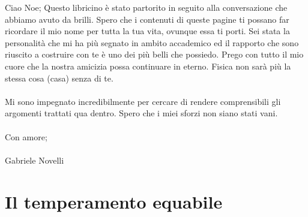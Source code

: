 \documentclass[12pt,a4paper]{book}
\theoremstyle{definition}
\theoremstyle{Theorem}
\theoremstyle{definition}
\theoremstyle{definition}
\theoremstyle{definition}
\begin{document}
	\setpdftargetpages
	Ciao Noe;
	Questo libricino è stato partorito in seguito alla conversazione che abbiamo avuto da brilli. Spero che i contenuti di queste pagine ti possano far ricordare il mio nome per tutta la tua vita, ovunque essa ti porti. Sei stata la personalità che mi ha più segnato in ambito accademico ed il rapporto che sono riuscito a costruire con te è uno dei più belli che possiedo. Prego con tutto il mio cuore che la nostra amicizia possa continuare in eterno. Fisica non sarà più la stessa cosa (casa) senza di te. \\
	\\
	Mi sono impegnato incredibilmente per cercare di rendere comprensibili gli argomenti trattati qua dentro. Spero che i miei sforzi non siano stati vani.\\
	\\
	Con amore;\\\\
	Gabriele Novelli
	\chapter{Il temperamento equabile}
\end{document}
